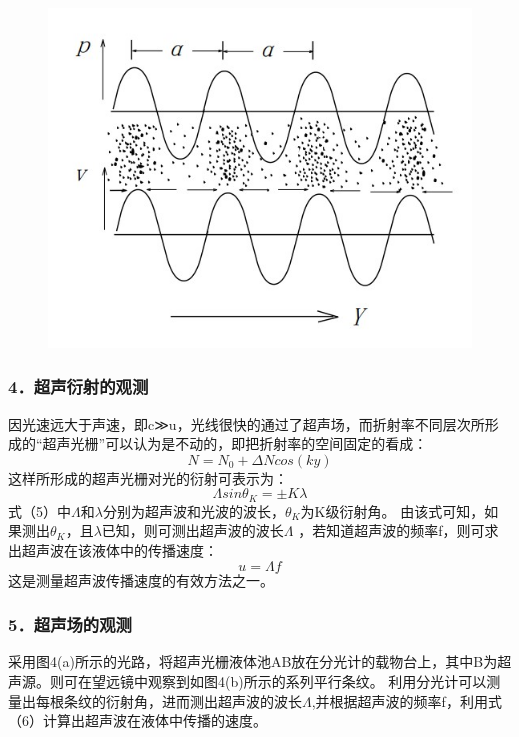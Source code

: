 \documentclass[12pt,a4paper,UTF8]{ctexart}
\begin{document}
\begin{figure}[htbp]
	\centering
	\includegraphics{img//3.jpg}
	\caption{}
\end{figure}

\subsubsection*{4．超声衍射的观测}
因光速远大于声速，即c≫u，光线很快的通过了超声场，而折射率不同层次所形成的“超声光栅”可以认为是不动的，即把折射率的空间固定的看成：
\begin{equation}
	N=N_0+\varDelta N cos(ky)
\end{equation}
这样所形成的超声光栅对光的衍射可表示为：
\begin{equation}
	\varLambda sin \theta_K = \pm K\lambda
\end{equation}
式（5）中$\varLambda $和$\lambda$分别为超声波和光波的波长，$\theta_K $为K级衍射角。
由该式可知，如果测出$\theta_K$，且$\lambda$已知，则可测出超声波的波长$\varLambda$ ，若知道超声波的频率f，则可求出超声波在该液体中的传播速度：
\begin{equation}
	u=\varLambda f
\end{equation}
这是测量超声波传播速度的有效方法之一。

\subsubsection*{5．超声场的观测}
采用图4(a)所示的光路，将超声光栅液体池AB放在分光计的载物台上，其中B为超声源。则可在望远镜中观察到如图4(b)所示的系列平行条纹。
利用分光计可以测量出每根条纹的衍射角，进而测出超声波的波长$\varLambda $,并根据超声波的频率f，利用式（6）计算出超声波在液体中传播的速度。
\end{document}
